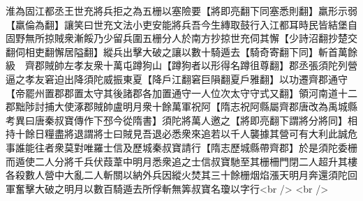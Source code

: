 淮為固江都丞王世充將兵拒之為五栅以塞險要【將即亮翻下同塞悉則翻】羸形示弱【羸倫為翻】讓笑曰世充文法小吏安能將兵吾今生縳取鼓行入江都耳時民皆結堡自固野無所掠賊衆漸餒乃少留兵圍五栅分人於南方抄掠世充伺其懈【少詩沼翻抄楚交翻伺相吏翻懈居隘翻】縱兵出擊大破之讓以數十騎遁去【騎奇寄翻下同】斬首萬餘級　齊郡賊帥左孝友衆十萬屯蹲狗山【蹲狗者以形得名蹲徂尊翻】郡丞張須陀列營逼之孝友窘迫出降須陀威振東夏【降戶江翻窘巨隕翻夏戶雅翻】以功遷齊郡通守【帝罷州置郡郡置太守其後諸郡各加置通守一人位次太守守式又翻】領河南道十二郡黜陟討捕大使涿郡賊帥盧明月衆十餘萬軍祝阿【隋志祝阿縣屬齊郡唐改為禹城縣　考異曰唐秦叔寶傳作下邳今從隋書】須陀將萬人邀之【將即亮翻下謂將分將同】相持十餘日糧盡將退謂將士曰賊見吾退必悉衆來追若以千人襲據其營可有大利此誠危事誰能往者衆莫對唯羅士信及歷城秦叔寶請行【隋志歷城縣帶齊郡】於是須陀委栅而遁使二人分將千兵伏葭葦中明月悉衆追之士信叔寶馳至其栅柵門閉二人超升其樓各殺數人營中大亂二人斬關以納外兵因縱火焚其三十餘栅烟焰漲天明月奔還須陀回軍奮擊大破之明月以數百騎遁去所俘斬無筭叔寶名瓊以字行<br />
<br />
